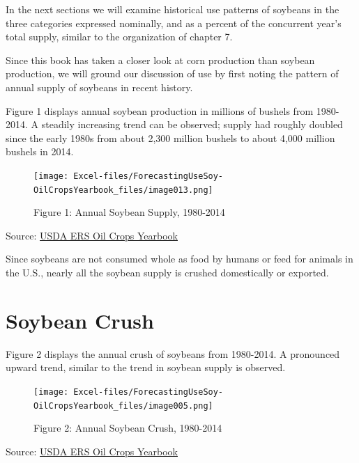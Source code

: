 \documentclass[
  letterpaper,
  DIV=11,
  numbers=noendperiod]{scrreprt}
\begin{document}
In the next sections we will examine historical use patterns of soybeans
in the three categories expressed nominally, and as a percent of the
concurrent year's total supply, similar to the organization of chapter
7.

Since this book has taken a closer look at corn production than soybean
production, we will ground our discussion of use by first noting the
pattern of annual supply of soybeans in recent history.

Figure 1 displays annual soybean production in millions of bushels from
1980-2014. A steadily increasing trend can be observed; supply had
roughly doubled since the early 1980s from about 2,300 million bushels
to about 4,000 million bushels in 2014.

\begin{figure}[H]

{\centering \texttt{[image: Excel-files/ForecastingUseSoy-OilCropsYearbook\_files/image013.png]}

}

\caption{Figure 1: Annual Soybean Supply, 1980-2014}

\end{figure}%

Source:
\href{http://www.ers.usda.gov/data-products/oil-crops-yearbook.aspx}{USDA
ERS Oil Crops Yearbook}

Since soybeans are not consumed whole as food by humans or feed for
animals in the U.S., nearly all the soybean supply is crushed
domestically or exported.

\section{Soybean Crush}\label{soybean-crush}

Figure 2 displays the annual crush of soybeans from 1980-2014. A
pronounced upward trend, similar to the trend in soybean supply is
observed.

\begin{figure}[H]

{\centering \texttt{[image: Excel-files/ForecastingUseSoy-OilCropsYearbook\_files/image005.png]}

}

\caption{Figure 2: Annual Soybean Crush, 1980-2014}

\end{figure}%

Source:
\href{http://www.ers.usda.gov/data-products/oil-crops-yearbook.aspx}{USDA
ERS Oil Crops Yearbook}
\end{document}
